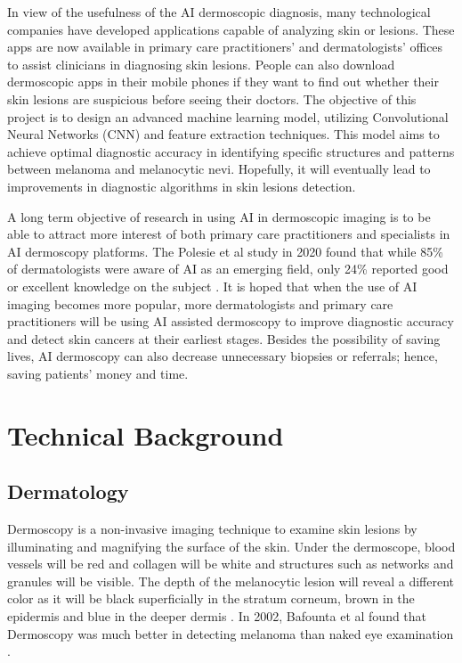 \documentclass[10pt,twocolumn]{article}
\begin{document}
\newline
\newline
In view of the usefulness of the AI dermoscopic diagnosis, many technological companies have developed applications capable of analyzing skin or lesions. These apps are now available in primary care practitioners’ and dermatologists’ offices to assist clinicians in diagnosing skin lesions. People can also download dermoscopic apps in their mobile phones if they want to find out whether their skin lesions are suspicious before seeing their doctors. 
\newline
\newline
The objective of this project is to design an advanced machine learning model, utilizing Convolutional Neural Networks (CNN) and feature extraction techniques. This model aims to achieve optimal diagnostic accuracy in identifying specific structures and patterns between melanoma and melanocytic nevi. Hopefully, it will eventually lead to improvements in diagnostic algorithms in skin lesions detection.

\newline
\newline
A long term objective of research in using AI in dermoscopic imaging is to be able to attract more interest of both primary care practitioners and specialists in AI dermoscopy platforms. The Polesie et al study in 2020 found that while 85\% of dermatologists were aware of AI as an emerging field, only 24\% reported good or excellent knowledge on the subject \cite{stiff2022artificial}. It is hoped that when the use of AI imaging becomes more popular, more dermatologists and primary care practitioners will be using AI assisted dermoscopy to improve diagnostic accuracy and detect skin cancers at their earliest stages. Besides the possibility of saving lives, AI dermoscopy can also decrease unnecessary biopsies or referrals; hence, saving patients’ money and time. 
\newline
\section{Technical Background}
\subsection{Dermatology}
Dermoscopy is a non-invasive imaging technique to examine skin lesions by illuminating and magnifying the surface of the skin. Under the dermoscope, blood vessels will be red and collagen will be white and structures such as networks and granules will be visible. The depth of the melanocytic lesion will reveal a different color as it will be black superficially in the stratum corneum, brown in the epidermis and blue in the deeper dermis \cite{sonthalia2019dermoscopy}. In 2002, Bafounta et al found that Dermoscopy was much better in detecting melanoma than naked eye examination \cite{bafounta2001dermoscopy}.
\end{document}
